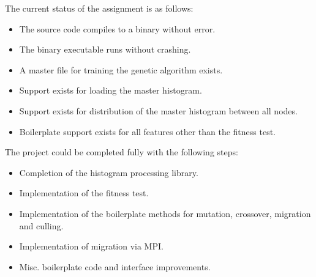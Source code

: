 \documentclass{article}
\begin{document}


The current status of the assignment is as follows:

\begin{itemize}
        \item The source code compiles to a binary without error.
        \item The binary executable runs without crashing.
        \item A master file for training the genetic algorithm exists.
        \item Support exists for loading the master histogram.
        \item Support exists for distribution of the master histogram between all nodes.
        \item Boilerplate support exists for all features other than the fitness test.
\end{itemize}

The project could be completed fully with the following steps:

\begin{itemize}
        \item Completion of the histogram processing library.
        \item Implementation of the fitness test.
        \item Implementation of the boilerplate methods for mutation, crossover, migration and culling.
        \item Implementation of migration via MPI.
        \item Misc. boilerplate code and interface improvements.
\end{itemize}
\end{document}
